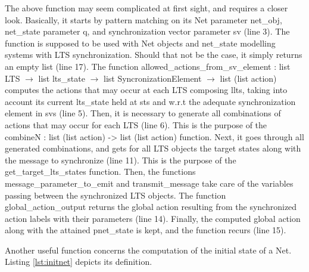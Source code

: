 			
	
	
	\noindent The above function may seem complicated at first sight, and requires 
	a closer look. Basically, it starts by pattern matching on its \textsf{Net} parameter
	\textsf{net\_obj}, \textsf{net\_state} parameter \textsf{q}, and synchronization vector parameter
	\textsf{sv} (line 3). The function is supposed to be used with \textsf{Net} objects and \textsf{net\_state}
	modelling systems with \textsf{LTS} synchronization. Should that not be the case, it simply returns
	an empty list (line 17). The function 
	\textsf{allowed\_actions\_from\_sv\_element : list LTS $\rightarrow$ list lts_state $\rightarrow$ 
	list SyncronizationElement $\rightarrow$ list (list action)} computes the \textsf{actions} that
	may occur at each \textsf{LTS} composing \textsf{llts}, taking into account its current
	\textsf{lts\_state} held at \textsf{sts} and w.r.t the adequate synchronization element
	in \textsf{svs} (line 5). Then, it is necessary to generate all combinations of \textsf{actions}
	that may occur for each \textsf{LTS} (line 6). This is the purpose of the
	\textsf{combineN : list (list action) -> list (list action)} function.  Next, it goes through 
	all generated combinations, and gets for all \textsf{LTS} objects
	the target states along with the message to synchronize (line 11). 
	This is the purpose of the \textsf{get\_target\_lts\_states}
	function. Then,  the functions \textsf{message\_parameter\_to\_emit} and
	\textsf{transmit\_message} take care of the variables passing between
	the synchronized \textsf{LTS} objects. The function 
	\textsf{global\_action\_output} returns the global action
	resulting from the synchronized \textsf{action} labels with their parameters (line 14).
	Finally, the computed global action along with the attained \textsf{pnet\_state} is kept,	
	and the function recurs (line 15). 
	 
		
		Another useful function concerns the computation of the initial state of a \textsf{Net}.
	Listing \ref{lst:initnet} depicts its definition.
	
			
	
